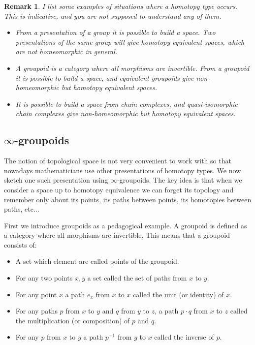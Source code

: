 \documentclass{article}
\newcommand{\sse}[1]{\medbreak \subsection{#1}}
\newtheorem{remark}{Remark}
\begin{document}
\begin{remark}
I list some examples of situations where a homotopy type occurs. This is indicative, and you are not supposed to understand any of them.
\begin{itemize}
\item From a presentation of a group it is possible to build a space. Two presentations of the same group will give homotopy equivalent spaces, which are not homeomorphic in general.
\item A groupoid is a category where all morphisms are invertible. From a groupoid it is possible to build a space, and equivalent groupoids give non-homeomorphic but homotopy equivalent spaces.
\item It is possible to build a space from chain complexes, and quasi-isomorphic chain complexes give non-homeomorphic but homotopy equivalent spaces.
\end{itemize}
\end{remark}


\sse{$\infty$-groupoids}

The notion of topological space is not very convenient to work with so that nowadays mathematicians use other presentations of homotopy types. We now sketch one such presentation using $\infty$-groupoids. The key idea is that when we consider a space up to homotopy equivalence we can forget its topology and remember only about its points, its paths between points, its homotopies between paths, etc...

First we introduce groupoids as a pedagogical example. A groupoid is defined as a category where all morphisms are invertible. This means that a groupoid consists of:
\begin{itemize}
\item A set which element are called points of the groupoid.
\item For any two points $x,y$ a set called the set of paths from $x$ to $y$.
\item For any point $x$ a path $e_x$ from $x$ to $x$ called the unit (or identity) of $x$.
\item For any paths $p$ from $x$ to $y$ and $q$ from $y$ to $z$, a path $p\cdot q$ from $x$ to $z$ called the multiplication (or composition) of $p$ and $q$.
\item For any $p$ from $x$ to $y$ a path $p^{-1}$ from $y$ to $x$ called the inverse of $p$. 
\end{itemize}
\end{document}
